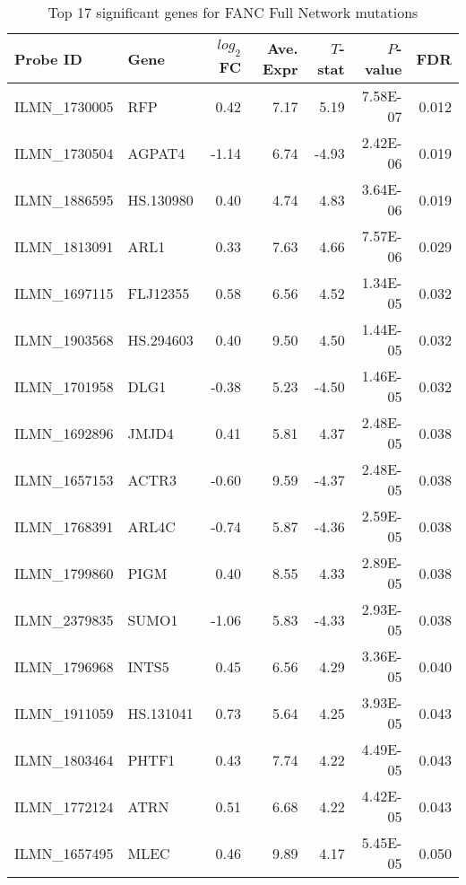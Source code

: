 \documentclass{article}\usepackage{knitr}
\begin{document}
\begin{table}[ht]
\centering
\caption{Top 17 significant genes for FANC Full Network mutations} 
\label{tab:FFN Results}
{\footnotesize
\begin{tabular}{llrrrrr}
  \toprule 
 Probe ID & Gene & $log_2$FC & Ave. Expr & $T$-stat & $P$-value & FDR\\
 \midrule 
 ILMN\_1730005 & RFP & 0.42 & 7.17 & 5.19 & 7.58E-07 & 0.012 \\ 
  ILMN\_1730504 & AGPAT4 & -1.14 & 6.74 & -4.93 & 2.42E-06 & 0.019 \\ 
  ILMN\_1886595 & HS.130980 & 0.40 & 4.74 & 4.83 & 3.64E-06 & 0.019 \\ 
  ILMN\_1813091 & ARL1 & 0.33 & 7.63 & 4.66 & 7.57E-06 & 0.029 \\ 
  ILMN\_1697115 & FLJ12355 & 0.58 & 6.56 & 4.52 & 1.34E-05 & 0.032 \\ 
  ILMN\_1903568 & HS.294603 & 0.40 & 9.50 & 4.50 & 1.44E-05 & 0.032 \\ 
  ILMN\_1701958 & DLG1 & -0.38 & 5.23 & -4.50 & 1.46E-05 & 0.032 \\ 
  ILMN\_1692896 & JMJD4 & 0.41 & 5.81 & 4.37 & 2.48E-05 & 0.038 \\ 
  ILMN\_1657153 & ACTR3 & -0.60 & 9.59 & -4.37 & 2.48E-05 & 0.038 \\ 
  ILMN\_1768391 & ARL4C & -0.74 & 5.87 & -4.36 & 2.59E-05 & 0.038 \\ 
  ILMN\_1799860 & PIGM & 0.40 & 8.55 & 4.33 & 2.89E-05 & 0.038 \\ 
  ILMN\_2379835 & SUMO1 & -1.06 & 5.83 & -4.33 & 2.93E-05 & 0.038 \\ 
  ILMN\_1796968 & INTS5 & 0.45 & 6.56 & 4.29 & 3.36E-05 & 0.040 \\ 
  ILMN\_1911059 & HS.131041 & 0.73 & 5.64 & 4.25 & 3.93E-05 & 0.043 \\ 
  ILMN\_1803464 & PHTF1 & 0.43 & 7.74 & 4.22 & 4.49E-05 & 0.043 \\ 
  ILMN\_1772124 & ATRN & 0.51 & 6.68 & 4.22 & 4.42E-05 & 0.043 \\ 
  ILMN\_1657495 & MLEC & 0.46 & 9.89 & 4.17 & 5.45E-05 & 0.050 \\ 
   \bottomrule 
\end{tabular}
}
\end{table}
\end{document}
